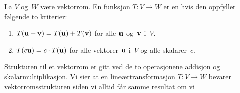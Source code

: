 
\begin{defn}
La $V$ og~$W$ være vektorrom.  En funksjon $T \colon V \to W$ er en
 hvis den oppfyller følgende to
kriterier:
\begin{enumerate}
\item $T(\mathbf{u} + \mathbf{v}) = T(\mathbf{u}) + T(\mathbf{v})$
      for alle $\mathbf{u}$ og~$\mathbf{v}$ i~$V$.
\item $T(c \mathbf{u}) = c \cdot T(\mathbf{u})$
      for alle vektorer $\mathbf{u}$ i~$V$ og alle skalarer~$c$.
\qedhere
\end{enumerate}
\end{defn}

Strukturen til et vektorrom er gitt ved de to operasjonene addisjon og
skalarmultiplikasjon.  Vi sier at en lineærtransformasjon
$T \colon V \to W$ bevarer vektorromsstrukturen siden vi alltid får
samme resultat om vi %


